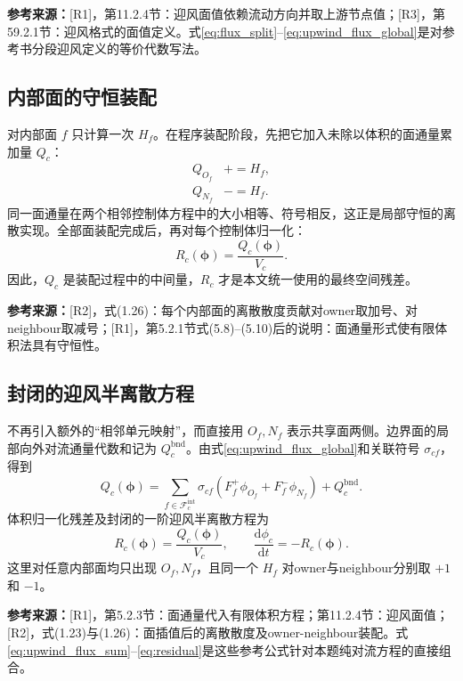 \documentclass[UTF8,12pt,a4paper]{ctexart}
\numberwithin{equation}{section}
\newcommand{\Rone}{\textnormal{[R1]}}
\newcommand{\Rtwo}{\textnormal{[R2]}}
\newcommand{\Rthree}{\textnormal{[R3]}}
\newcommand{\source}[1]{%
  \par\smallskip
  \noindent\colorbox{sourcebg}{%
    \parbox{0.955\linewidth}{\footnotesize\color{sourcegray}\textbf{参考来源：}#1}%
  }
  \par\smallskip
}
\newcommand{\phiv}{\bm\phi}
\begin{document}
\source{\Rone，第11.2.4节：迎风面值依赖流动方向并取上游节点值；\Rthree，第59.2.1节：迎风格式的面值定义。式\eqref{eq:flux_split}--\eqref{eq:upwind_flux_global}是对参考书分段迎风定义的等价代数写法。}

\subsection{内部面的守恒装配}

对内部面 $f$ 只计算一次 $H_f$。在程序装配阶段，先把它加入未除以体积的面通量累加量 $Q_c$：
\begin{align}
  Q_{O_f}&\mathrel{+}=H_f,
  \label{eq:owner_add}\\
  Q_{N_f}&\mathrel{-}=H_f.
  \label{eq:neighbour_subtract}
\end{align}
同一面通量在两个相邻控制体方程中的大小相等、符号相反，这正是局部守恒的离散实现。全部面装配完成后，再对每个控制体归一化：
\begin{equation}
  \boxed{R_c(\phiv)=\frac{Q_c(\phiv)}{V_c}.}
  \label{eq:normalize_residual}
\end{equation}
因此，$Q_c$ 是装配过程中的中间量，$R_c$ 才是本文统一使用的最终空间残差。

\source{\Rtwo，式(1.26)：每个内部面的离散散度贡献对owner取加号、对neighbour取减号；\Rone，第5.2.1节式(5.8)--(5.10)后的说明：面通量形式使有限体积法具有守恒性。}

\subsection{封闭的迎风半离散方程}

不再引入额外的“相邻单元映射”，而直接用 $O_f,N_f$ 表示共享面两侧。边界面的局部向外对流通量代数和记为 $Q_c^{\mathrm{bnd}}$。由式\eqref{eq:upwind_flux_global}和关联符号 $\sigma_{cf}$，得到
\begin{equation}
  \boxed{
  Q_c(\phiv)
  =\sum_{f\in\mathcal F_c^{\mathrm{int}}}
  \sigma_{cf}
  \left(F_f^+\phi_{O_f}+F_f^-\phi_{N_f}\right)
  +Q_c^{\mathrm{bnd}}
  }.
  \label{eq:upwind_flux_sum}
\end{equation}
体积归一化残差及封闭的一阶迎风半离散方程为
\begin{equation}
  \boxed{
  R_c(\phiv)=\frac{Q_c(\phiv)}{V_c},
  \qquad
  \frac{\mathrm d\phi_c}{\mathrm dt}=-R_c(\phiv).}
  \label{eq:residual}
\end{equation}
这里对任意内部面均只出现 $O_f,N_f$，且同一个 $H_f$ 对owner与neighbour分别取 $+1$ 和 $-1$。

\source{\Rone，第5.2.3节：面通量代入有限体积方程；第11.2.4节：迎风面值；\Rtwo，式(1.23)与(1.26)：面插值后的离散散度及owner-neighbour装配。式\eqref{eq:upwind_flux_sum}--\eqref{eq:residual}是这些参考公式针对本题纯对流方程的直接组合。}
\end{document}
